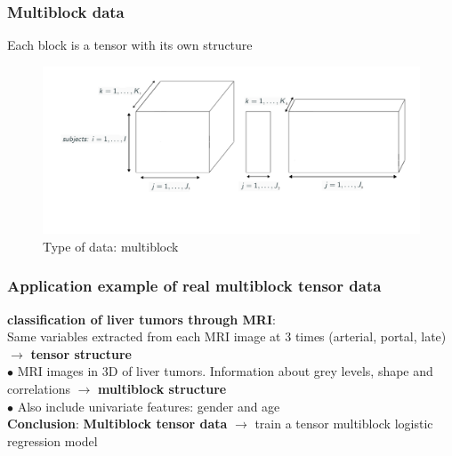 \documentclass{beamer}
\begin{document}
\begin{frame}
    \frametitle{Multiblock data}
Each block is a tensor with its own structure
    \begin{figure}
        \centering
        \includegraphics[scale = 0.25]{images/blocks.png}
        \caption{Type of data: multiblock}
    \end{figure}


\end{frame}

\begin{frame}
    \frametitle{Application example of real multiblock tensor data}
    \textbf{classification of liver tumors through MRI}:\\[15 pt]
    Same variables extracted from each MRI image at 3 times  (arterial, portal, late) $\rightarrow$ \textbf{tensor structure}\\[10 pt]

    $\bullet$ MRI images in 3D of liver tumors. Information about grey levels, shape and correlations  $\rightarrow$ \textbf{multiblock structure}\\[5 pt]
    $\bullet$ Also include univariate features: gender and age\\[10 pt]

    \textbf{Conclusion}: \textbf{Multiblock tensor data} $\rightarrow$ train a tensor multiblock logistic regression model
    
\end{frame}
\end{document}
